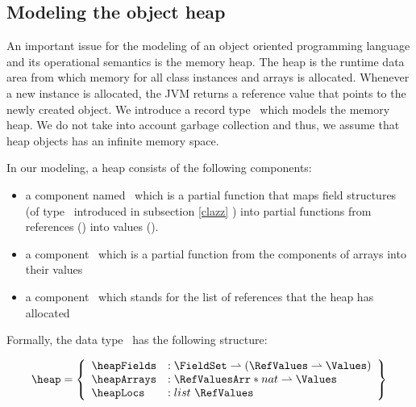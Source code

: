 \index{\HeapSet}
\index{\heap}
\index{\heapArrays}
\index{\heapArrays} 
\index{\heapTypeOf}

 \subsection{Modeling the object heap} \label{heap}
 An important issue for the modeling of an object oriented programming language and its operational semantics
 is the memory heap. The heap is the
 runtime data area from which memory  for all class instances and arrays is allocated. Whenever a new instance
 is allocated, the JVM returns a reference value that points to the newly created object. 
 We introduce a record type \HeapSet \ which models the memory heap. We do not take into account 
 garbage collection and thus, we assume that heap objects has an infinite memory space. 
 
 In our modeling, a heap consists of the following components:
 \begin{itemize}
       \item a component  named \heapFields \ which is a partial function that maps field
             structures (of type \FieldSet \ introduced in subsection \ref{clazz} ) into partial functions from references (\AllRefs)
	     into values (\Values).  
 

       \item  a component \heapArrays \ which is a partial function from the components of arrays  into their values

       \item  a component  \heapLocs  \ which stands for the  list of references that the heap has allocated  
              
 \end{itemize}


 Formally, the data type \HeapSet \ has the following structure:



  $$ \begin{array}{l}
         
         \heap = \left\{\begin{array}{ll}  \heapFields  &  : \FieldSet \rightharpoonup (  \RefValues \rightharpoonup \Values) \\
                                           \heapArrays  &  : \RefValuesArr * nat \rightharpoonup \Values \\
					   \heapLocs    &  : list \ \RefValues \\
                    \end{array} \right\}
   \end{array} $$


